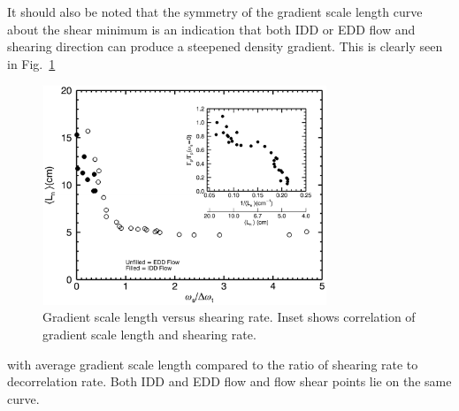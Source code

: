 \documentclass[%
 aps,
 prl,
 amsmath,amssymb,
 reprint,%
]{revtex4-1}
\begin{document}
It should also be noted that the symmetry of the gradient scale length curve about the shear minimum is an indication that both IDD or EDD flow and shearing direction can produce a steepened density gradient. This is clearly seen in
Fig.~\ref{fig:shearandgrad}
\begin{figure}
\begin{center}
\includegraphics[width=8.5cm]{shearandgrad.pdf}%
\end{center}
\caption{\label{fig:shearandgrad} Gradient scale length versus shearing rate. Inset shows correlation of gradient scale length and shearing rate.}
\end{figure}
with average gradient scale length compared to the ratio of shearing rate to decorrelation rate. Both IDD and EDD flow and flow shear points lie on the same curve.
\end{document}
